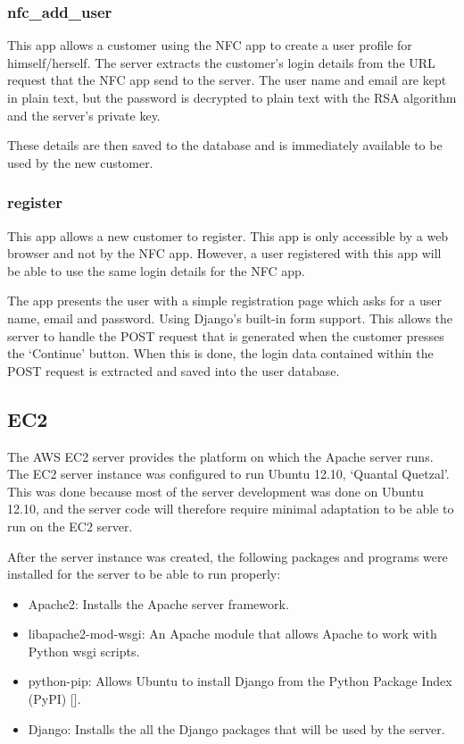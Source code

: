 \subsubsection{nfc\_add\_user}

This app allows a customer using the NFC app to create a user profile for himself/herself. The
server extracts the customer's login details from the URL request that the NFC app send to the
server. The user name and email are kept in plain text, but the password is decrypted to
plain text with the RSA algorithm and the server's private key.

These details are then saved to the database and is immediately available to be used by the new
customer. 

\subsubsection{register}

This app allows a new customer to register. This app is only accessible by a web browser and
not by the NFC app. However, a user registered with this app will be able to use the same login
details for the NFC app.

The app presents the user with a simple registration page which asks for a user name, email and
password. Using Django's built-in form support. This allows the server to handle the
POST request that is generated when the customer presses the `Continue' button. When this is
done, the login data contained within the POST request is extracted and saved into the user
database. 

\subsection{EC2}

The AWS EC2 server provides the platform on which the Apache
server runs. The EC2 server instance was configured to run
Ubuntu 12.10, `Quantal Quetzal'. This was done because most
of the server development was done on Ubuntu 12.10, and the
server code will therefore require minimal adaptation to be able to run on the EC2 server.

After the server instance was created, the following
packages and programs were installed for the server to be able to run properly:

\begin{itemize}
  \item Apache2: Installs the Apache server framework.
  \item libapache2-mod-wsgi: An Apache module that allows Apache to work with Python wsgi
  scripts.
  \item python-pip: Allows Ubuntu to install Django from the Python Package Index (PyPI)
  [\cite{website:pypi}].
  \item Django: Installs the all the Django packages that will be used by the server. 
\end{itemize}

